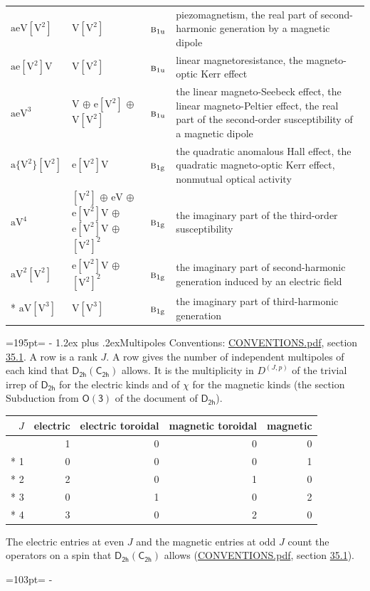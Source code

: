\documentclass[10pt,a4paper]{article}
\makeatletter
\renewcommand\section{\@startsection{section}{1}{\z@}{-3ex plus -1ex minus -.2ex}%
  {1.2ex plus .2ex}{\normalfont\large\sffamily\bfseries\color{parttitle}}}
\newcommand{\needspace}[1]{\par\penalty-100\begingroup\dimen0=#1\relax\dimen2=\pagegoal
  \advance\dimen2-\pagetotal\ifdim\dimen0>\dimen2\relax\ifdim\dimen2>0pt\vfil\break\fi\fi
  \endgroup}
\numberwithin{equation}{section}
\newcommand{\grp}[1]{\mathsf{#1}}
\newcommand{\irr}[1]{\text{\normalfont\scshape #1}}
\newcommand{\ptag}[1]{\mathrm{#1}}
\newcommand{\irrJp}[2]{D^{(#1,#2)}}
\newcommand{\jahn}[1]{\mathrm{#1}}
\newlength{\fillwidth}\newlength{\cellwidth}\newlength{\colwidth}
\makeatother
\begin{document}
{\begin{longtable}{@{}lll>{\RaggedRight\arraybackslash}p{\fillwidth}@{}}
$\jahn{aeV[V^{2}]}$ & $\jahn{V[V^{2}]}$ & $\irr{b}_{1\ptag{u}}$ & piezomagnetism, the real part of second-harmonic generation by a magnetic dipole\\
$\jahn{ae[V^{2}]V}$ & $\jahn{V[V^{2}]}$ & $\irr{b}_{1\ptag{u}}$ & linear magnetoresistance, the magneto-optic Kerr effect\\
$\jahn{aeV^{3}}$ & $\jahn{V}$ $\oplus$ $\jahn{e[V^{2}]}$ $\oplus$ $\jahn{V[V^{2}]}$ & $\irr{b}_{1\ptag{u}}$ & the linear magneto-Seebeck effect, the linear magneto-Peltier effect, the real part of the second-order susceptibility of a magnetic dipole\\
$\jahn{a\{V^{2}\}[V^{2}]}$ & $\jahn{e[V^{2}]V}$ & $\irr{b}_{1\ptag{g}}$ & the quadratic anomalous Hall effect, the quadratic magneto-optic Kerr effect, nonmutual optical activity\\
$\jahn{aV^{4}}$ & $\jahn{[V^{2}]}$ $\oplus$ $\jahn{eV}$ $\oplus$ $\jahn{e[V^{2}]V}$ $\oplus$ $\jahn{e[V^{2}]V}$ $\oplus$ $\jahn{[V^{2}]^{2}}$ & $\irr{b}_{1\ptag{g}}$ & the imaginary part of the third-order susceptibility\\
$\jahn{aV^{2}[V^{2}]}$ & $\jahn{e[V^{2}]V}$ $\oplus$ $\jahn{[V^{2}]^{2}}$ & $\irr{b}_{1\ptag{g}}$ & the imaginary part of second-harmonic generation induced by an electric field\\*
$\jahn{aV[V^{3}]}$ & $\jahn{V[V^{3}]}$ & $\irr{b}_{1\ptag{g}}$ & the imaginary part of third-harmonic generation\\
\bottomrule\end{longtable}}
\needspace{195pt}
\section{Multipoles}\label{s:multipoles}
Conventions: \href{../../CONVENTIONS.pdf}{CONVENTIONS.pdf}, section \href{../../CONVENTIONS.pdf\#conv.35.1}{35.1}.
A row is a rank $J$. \label{n:head.multipole.electric}\label{n:head.multipole.electric.toroidal}\label{n:head.multipole.magnetic.toroidal}\label{n:head.multipole.magnetic}A row gives the number of independent multipoles of each kind that $\grp{D_{2h}}(\grp{C_{2h}})$ allows. It is the multiplicity in $\irrJp{J}{p}$ of the trivial irrep of $\grp{D_{2h}}$ for the electric kinds and of $\chi$ for the magnetic kinds (the section Subduction from $\grp{O(3)}$ of the document of \href{../../../rotation/data/pdf/D2h.pdf}{$\grp{D_{2h}}$}).
{\small\begin{longtable}{@{}rrrrr@{}}\toprule
$J$ & electric & electric toroidal & magnetic toroidal & magnetic\\\midrule\endhead
\bottomrule\endfoot\endlastfoot
0 & 1 & 0 & 0 & 0\\*
1 & 0 & 0 & 0 & 1\\*
2 & 2 & 0 & 1 & 0\\*
3 & 0 & 1 & 0 & 2\\*
4 & 3 & 0 & 2 & 0\\
\bottomrule\end{longtable}}
The electric entries at even $J$ and the magnetic entries at odd $J$ count the operators on a spin that $\grp{D_{2h}}(\grp{C_{2h}})$ allows (\href{../../CONVENTIONS.pdf}{CONVENTIONS.pdf}, section \href{../../CONVENTIONS.pdf\#conv.35.1}{35.1}).
\needspace{103pt}
\end{document}
